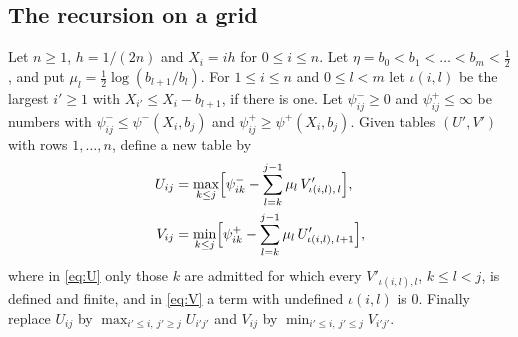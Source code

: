 \documentclass[11pt,a4paper]{amsart}
\theoremstyle{remark}
\numberwithin{equation}{section}
\begin{document}
\subsection{The recursion on a grid}
Let $n\ge1$, $h=1/(2n)$ and $X_i=ih$ for $0\le i\le n$. Let $\eta=b_0<b_1<\dots<b_m<\frac12$, and put
$\mu_l=\frac12\log(b_{l+1}/b_l)$. For $1\le i\le n$ and $0\le l<m$ let $\iota(i,l)$ be the largest $i'\ge1$ with
$X_{i'}\le X_i-b_{l+1}$, if there is one. Let $\psi^-_{ij}\ge0$ and $\psi^+_{ij}\le\infty$ be numbers with
$\psi^-_{ij}\le\psi^-(X_i,b_j)$ and $\psi^+_{ij}\ge\psi^+(X_i,b_j)$. Given tables $(U',V')$ with rows $1,\dots,n$,
define a new table by
\begin{align}
U_{ij}&=\max_{k\le j}\Bigl[\psi^-_{ik}-\sum_{l=k}^{j-1}\mu_l\,V'_{\iota(i,l),\,l}\Bigr],\label{eq:U}\\
V_{ij}&=\min_{k\le j}\Bigl[\psi^+_{ik}-\sum_{l=k}^{j-1}\mu_l\,U'_{\iota(i,l),\,l+1}\Bigr],\label{eq:V}
\end{align}
where in \eqref{eq:U} only those $k$ are admitted for which every $V'_{\iota(i,l),l}$, $k\le l<j$, is defined and
finite, and in \eqref{eq:V} a term with undefined $\iota(i,l)$ is $0$. Finally replace $U_{ij}$ by
$\max_{i'\le i,\ j'\ge j}U_{i'j'}$ and $V_{ij}$ by $\min_{i'\le i,\ j'\le j}V_{i'j'}$.
\end{document}
